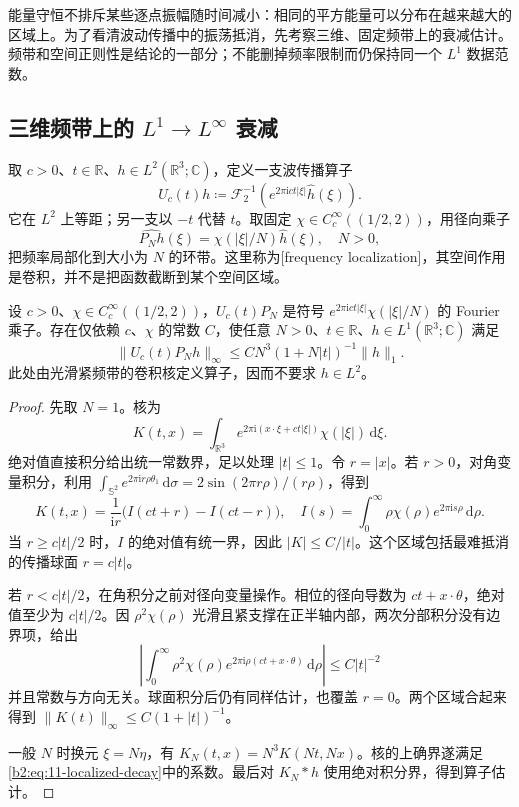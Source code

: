 
能量守恒不排斥某些逐点振幅随时间减小：相同的平方能量可以分布在越来越大的区域上。为了看清波动传播中的振荡抵消，先考察三维、固定频带上的衰减估计。频带和空间正则性是结论的一部分；不能删掉频率限制而仍保持同一个 \(L^1\) 数据范数。

\subsection{三维频带上的 \texorpdfstring{\(L^1\to L^\infty\)}{L¹→L∞} 衰减}
\label{b2:subsec:110401}

取 \(c>0\)、\(t\in\mathbb R\)、\(h\in L^2(\mathbb R^3;\mathbb C)\)，定义一支波传播算子
\[
 U_c(t)h\coloneqq\mathcal F_2^{-1}
 \left(e^{2\pi\mathrm{i}ct|\xi|}\widehat h(\xi)\right).
\]
它在 \(L^2\) 上等距；另一支以 \(-t\) 代替 \(t\)。取固定 \(\chi\in C_c^\infty((1/2,2))\)，用径向乘子
\[
 \widehat{P_Nh}(\xi)=\chi(|\xi|/N)\widehat h(\xi),\quad N>0,
\]
把频率局部化到大小为 \(N\) 的环带。这里称为[frequency localization]，其空间作用是卷积，并不是把函数截断到某个空间区域。

\begin{theorem}[三维频带衰减]\label{b2:thm:11-localized-decay}
设 \(c>0\)、\(\chi\in C_c^\infty((1/2,2))\)，\(U_c(t)P_N\) 是符号 \(e^{2\pi\mathrm ict|\xi|}\chi(|\xi|/N)\) 的 Fourier 乘子。存在仅依赖 \(c\)、\(\chi\) 的常数 \(C\)，使任意 \(N>0\)、\(t\in\mathbb R\)、\(h\in L^1(\mathbb R^3;\mathbb C)\) 满足
\begin{equation}\label{b2:eq:11-localized-decay}
 \|U_c(t)P_Nh\|_\infty
 \leq C N^3(1+N|t|)^{-1}\|h\|_1.
\end{equation}
此处由光滑紧频带的卷积核定义算子，因而不要求 \(h\in L^2\)。
\end{theorem}
\begin{proof}
先取 \(N=1\)。核为
\[
 K(t,x)=\int_{\mathbb R^3}e^{2\pi\mathrm{i}(x\cdot\xi+ct|\xi|)}
                       \chi(|\xi|)\,\mathrm{d}\xi.
\]
绝对值直接积分给出统一常数界，足以处理 \(|t|\leq1\)。令 \(r=|x|\)。若 \(r>0\)，对角变量积分，利用
\(\int_{\mathbb S^2}e^{2\pi\mathrm{i}r\rho\theta_1}\,\mathrm{d}\sigma
=2\sin(2\pi r\rho)/(r\rho)\)，得到
\[
 K(t,x)=\dfrac1{\mathrm{i}r}\bigl(I(ct+r)-I(ct-r)\bigr),\quad
 I(s)=\int_0^\infty\rho\chi(\rho)e^{2\pi\mathrm{i}s\rho}\,\mathrm{d}\rho.
\]
当 \(r\geq c|t|/2\) 时，\(I\) 的绝对值有统一界，因此 \(|K|\leq C/|t|\)。这个区域包括最难抵消的传播球面 \(r=c|t|\)。

若 \(r<c|t|/2\)，在角积分之前对径向变量操作。相位的径向导数为 \(ct+x\cdot\theta\)，绝对值至少为 \(c|t|/2\)。因 \(\rho^2\chi(\rho)\) 光滑且紧支撑在正半轴内部，两次分部积分没有边界项，给出
\[
 \left|\int_0^\infty\rho^2\chi(\rho)
 e^{2\pi\mathrm{i}\rho(ct+x\cdot\theta)}\,\mathrm{d}\rho\right|
 \leq C|t|^{-2}
\]
并且常数与方向无关。球面积分后仍有同样估计，也覆盖 \(r=0\)。两个区域合起来得到 \(\|K(t)\|_\infty\leq C(1+|t|)^{-1}\)。

一般 \(N\) 时换元 \(\xi=N\eta\)，有 \(K_N(t,x)=N^3K(Nt,Nx)\)。核的上确界遂满足\eqref{b2:eq:11-localized-decay}中的系数。最后对 \(K_N*h\) 使用绝对积分界，得到算子估计。
\end{proof}

